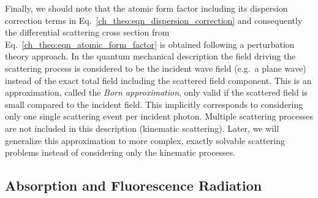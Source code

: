 Finally, we should note that the atomic form factor including its dispersion correction terms in Eq.~\eqref{ch_theo:eqn_dispersion_correction} and consequently the differential scattering cross section from Eq.~\eqref{ch_theo:eqn_atomic_form_factor} is obtained following a perturbation theory approach. In the quantum mechanical description the field driving the scattering process is considered to be the incident wave field (e.g.~a plane wave) instead of the exact total field including the scattered field component. This is an approximation, called the \emph{Born approximation}, only valid if the scattered field is small compared to the incident field. This implicitly corresponds to considering only one single scattering event per incident photon. Multiple scattering processes are not included in this description (kinematic scattering). Later, we will generalize this approximation to more complex, exactly solvable scattering problems instead of considering only the kinematic processes.




\subsection{Absorption and Fluorescence Radiation}

